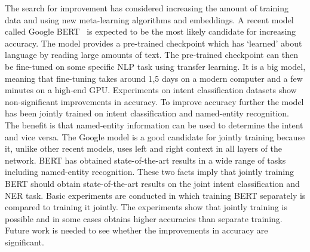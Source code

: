 The search for improvement has considered increasing the amount of training data and using new meta-learning algorithms and embeddings.
A recent model called Google BERT~\citep{devlin2018} is expected to be the most likely candidate for increasing accuracy.
The model provides a pre-trained checkpoint which has `learned' about language by reading large amounts of text.
The pre-trained checkpoint can then be fine-tuned on some specific NLP task using transfer learning.
It is a big model, meaning that fine-tuning takes around 1,5 days on a modern computer and a few minutes on a high-end GPU.
Experiments on intent classification datasets show non-significant improvements in accuracy.
To improve accuracy further the model has been jointly trained on intent classification and named-entity recognition.
The benefit is that named-entity information can be used to determine the intent and vice versa.
The Google model is a good candidate for jointly training because it, unlike other recent models, uses left and right context in all layers of the network.
BERT has obtained state-of-the-art results in a wide range of tasks including named-entity recognition.
These two facts imply that jointly training BERT should obtain state-of-the-art results on the joint intent classification and NER task.
Basic experiments are conducted in which training BERT separately is compared to training it jointly.
The experiments show that jointly training is possible and in some cases obtains higher accuracies than separate training.
Future work is needed to see whether the improvements in accuracy are significant.

\iffalse
In general the NLP field is in an interesting state.
Technology companies have a lot of incentive to push the field forward.
Leaps in the last few years have come from those companies.
For example, FastText by Facebook and transformer models by Google.
A second observation is that state-of-the-art scores are increased every few months.
This results in papers which are quickly pushed to arXiv and cited before any scholarly peer review.
Papers report accuracy high scores with ``few mentions of average cases and variability or worst-cases''~\citep{otter2018survey}.
\fi


